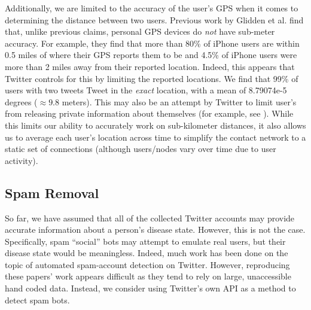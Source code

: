 Additionally, we are limited to the accuracy of the user's GPS when it comes to determining the distance between two users. Previous work by Glidden et al. \cite{yelpgps} find that, unlike previous claims\cite{zandbergen2011positional,djuknic2001geolocation,modsching2006field}, personal GPS devices do \emph{not} have sub-meter accuracy. For example, they find that more than 80\% of iPhone users are within 0.5 miles of where their GPS reports them to be and 4.5\% of iPhone users were more than 2 miles away from their reported location. Indeed, this appears that Twitter controls for this by limiting the reported locations. We find that 99\% of users with two tweets Tweet in the \emph{exact} location, with a mean of 8.79074e-5 degrees (\(\approx 9.8\) meters). This may also be an attempt by Twitter to limit user's from releasing private information about themselves (for example, see \cite{defcon}). %
While this limits our ability to accurately work on sub-kilometer distances, it also allows us to average each user's location across time to simplify the contact network to a static set of connections (although users/nodes vary over time due to user activity). 



\subsection{Spam Removal}
\label{sec:spam}
So far, we have assumed that all of the collected Twitter accounts may provide accurate information about a person's disease state. However, this is not the case. Specifically, spam ``social'' bots \cite{boshmaf2011socialbot} may attempt to emulate real users, but their disease state would be meaningless. Indeed, much work\cite{Krause:2012uz,Biro:2008wd,Anonymous:iQRVCsVz} has been done on the topic of automated spam-account detection on Twitter. However, reproducing these papers' work appears difficult as they tend to rely on large, unaccessible hand coded data. Instead, we consider using Twitter's own API as a method to detect spam bots.


